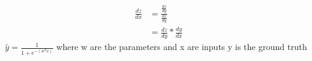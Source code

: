 \documentclass{article}
\begin{document}
  \begin{equation} 
\begin{split}
\frac{dz}{dx} & = \frac{\frac{dz}{dy}}{\frac{dx}{dy}} \\
 & = \frac{dz}{dy} * \frac{dy}{dx}
\end{split}
\end{equation}
\newpage
\begin{math}
\hat{y} = \frac{1}{1+e^{-(w^{T}x)}}
\end{math}
\newline
\newline
where w are the parameters and x are inputs
\newline
y is the ground truth
\end{document}
